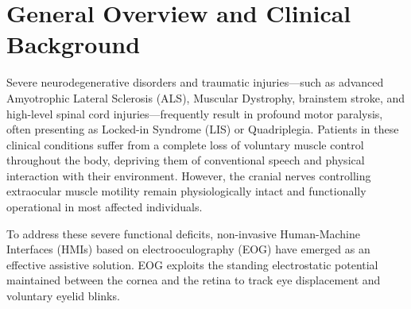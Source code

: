 \section{General Overview and Clinical Background}
\label{sec:general_overview_clinical_background}

Severe neurodegenerative disorders and traumatic injuries---such as advanced Amyotrophic Lateral Sclerosis (ALS), Muscular Dystrophy, brainstem stroke, and high-level spinal cord injuries---frequently result in profound motor paralysis, often presenting as Locked-in Syndrome (LIS) or Quadriplegia. Patients in these clinical conditions suffer from a complete loss of voluntary muscle control throughout the body, depriving them of conventional speech and physical interaction with their environment. However, the cranial nerves controlling extraocular muscle motility remain physiologically intact and functionally operational in most affected individuals.

To address these severe functional deficits, non-invasive Human-Machine Interfaces (HMIs) based on electrooculography (EOG) have emerged as an effective assistive solution. EOG exploits the standing electrostatic potential maintained between the cornea and the retina to track eye displacement and voluntary eyelid blinks.

